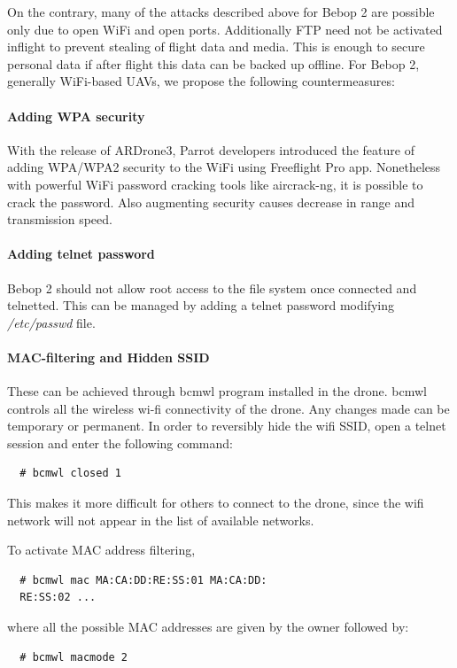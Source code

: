 \documentclass[conference]{IEEEtran}
\begin{document}
On the contrary, many of the attacks described above for Bebop 2 are possible only due to open WiFi and open ports. Additionally FTP need not be activated inflight to prevent stealing of flight data and media. This is enough to secure personal data if after flight this data can be backed up offline. For Bebop 2, generally WiFi-based UAVs, we propose the following countermeasures:
\paragraph{Adding WPA security}
With the release of ARDrone3, Parrot developers introduced the feature of adding WPA/WPA2 security to the WiFi using Freeflight Pro app. Nonetheless with powerful WiFi password cracking tools like aircrack-ng, it is possible to crack the password. Also augmenting security causes decrease in range and transmission speed. 
\paragraph{Adding telnet password}
Bebop 2 should not allow root access to the file system once connected and telnetted. This can be managed by adding a telnet password modifying \emph{/etc/passwd} file. 
\paragraph{MAC-filtering and Hidden SSID}
These can be achieved through bcmwl program installed in the drone. bcmwl controls all the wireless wi-fi connectivity of the drone. Any changes made can be temporary or permanent. In order to reversibly hide the wifi SSID, open a telnet session and enter the following command:

\begin{lstlisting}
  # bcmwl closed 1
\end{lstlisting} 

This makes it more difficult for others to connect to the drone, since the wifi network will not appear in the list of available networks.

To activate MAC address filtering, 
\begin{lstlisting}
  # bcmwl mac MA:CA:DD:RE:SS:01 MA:CA:DD:
  RE:SS:02 ...
\end{lstlisting} 
where all the possible MAC addresses are given by the owner followed by:
\begin{lstlisting}
  # bcmwl macmode 2
\end{lstlisting} 
\end{document}
